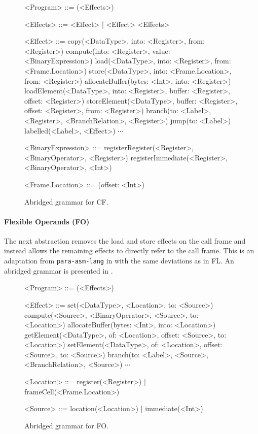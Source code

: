 \documentclass[main.tex]{subfiles}
\begin{document}
\begin{figure}[ht]
	\begin{grammar}
		
		<Program> ::= (<Effects>)
		
		<Effects> ::= <Effect> | <Effect> <Effects>
		
		<Effect> ::= copy(<DataType>, into: <Register>, from: <Register>)
			\alt compute(into: <Register>, value: <BinaryExpression>)
			\alt load(<DataType>, into: <Register>, from: <Frame.Location>)
			\alt store(<DataType>, into: <Frame.Location>, from: <Register>)
			\alt allocateBuffer(bytes: <Int>, into: <Register>)
			\alt loadElement(<DataType>, into: <Register>, buffer: <Register>, offset: <Register>)
			\alt storeElement(<DataType>, buffer: <Register>, offset: <Register>, from: <Register>)
			\alt branch(to: <Label>, <Register>, <BranchRelation>, <Register>)
			\alt jump(to: <Label>)
			\alt labelled(<Label>, <Effect>)
			\alt $\cdots$
		
		<BinaryExpression> ::= registerRegister(<Register>, <BinaryOperator>, <Register>)
			\alt registerImmediate(<Register>, <BinaryOperator>, <Int>)
		
		<Frame.Location> ::= (offset: <Int>)
		
	\end{grammar}
	\caption{Abridged grammar for CF.}
	\label{bnf:cf}
\end{figure}

\paragraph{Flexible Operands (FO)} The next abstraction removes the load and store effects on the call frame and instead allows the remaining effects to directly refer to the call frame. This is an adaptation from \texttt{para-asm-lang} in \cite{:compcourse} with the same deviations as in FL. An abridged grammar is presented in .

\begin{figure}[ht]
	\begin{grammar}
		
		<Program> ::= (<Effects>)
		
		<Effect> ::= set(<DataType>, <Location>, to: <Source>)
			\alt compute(<Source>, <BinaryOperator>, <Source>, to: <Location>)
			\alt allocateBuffer(bytes: <Int>, into: <Location>)
			\alt getElement(<DataType>, of: <Location>, offset: <Source>, to: <Location>)
			\alt setElement(<DataType>, of: <Location>, offset: <Source>, to: <Source>)
			\alt branch(to: <Label>, <Source>, <BranchRelation>, <Source>)
			\alt $\cdots$
		
		<Location> ::= register(<Register>) | frameCell(<Frame.Location>)
		
		<Source> ::= location(<Location>) | immediate(<Int>)
		
	\end{grammar}
	\caption{Abridged grammar for FO.}
	\label{bnf:fo}
\end{figure}
\end{document}
